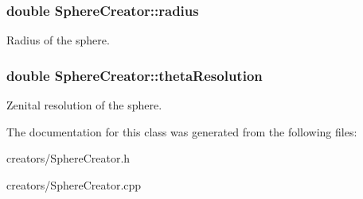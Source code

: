 \subsubsection[{\texorpdfstring{radius}{radius}}]{\setlength{\rightskip}{0pt plus 5cm}double Sphere\+Creator\+::radius\hspace{0.3cm}{\ttfamily [private]}}\hypertarget{class_sphere_creator_aa0e357cf00720699cdaee04253ce492d}{}\label{class_sphere_creator_aa0e357cf00720699cdaee04253ce492d}
Radius of the sphere. 
\subsubsection[{\texorpdfstring{theta\+Resolution}{thetaResolution}}]{\setlength{\rightskip}{0pt plus 5cm}double Sphere\+Creator\+::theta\+Resolution\hspace{0.3cm}{\ttfamily [private]}}\hypertarget{class_sphere_creator_a062bf41868fd771016df76cb19550c36}{}\label{class_sphere_creator_a062bf41868fd771016df76cb19550c36}
Zenital resolution of the sphere. 

The documentation for this class was generated from the following files\+:\begin{DoxyCompactItemize}
\item 
creators/Sphere\+Creator.\+h\item 
creators/Sphere\+Creator.\+cpp\end{DoxyCompactItemize}
